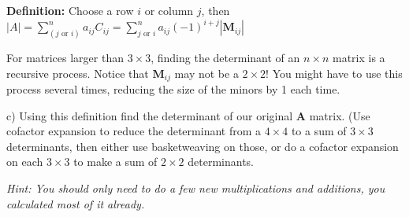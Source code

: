 \documentclass{article}
\begin{document}
\begin{flushleft}
\textbf{Definition:} Choose a row $i$ or column $j$, then $|A|=\sum\limits^{n}_{(j \text{ or } i)} a_{ij} C_{ij} = \sum\limits^{n}_{j \text{ or } i} a_{ij} (-1)^{i+j} |\textbf{M}_{ij}| $

\vspace{0.2in}

For matrices larger than $3 \times 3$, finding the determinant of an $n \times n$ matrix is a recursive process.  Notice that $\textbf{M}_{ij}$ may not be a $2 \times 2$!  You might have to use this process several times, reducing the size of the minors by 1 each time.

\vspace{0.2in}

c) Using this definition find the determinant of our original $\textbf{A}$ matrix.  (Use cofactor expansion to reduce the determinant from a $4 \times 4$ to a sum of $3 \times 3$ determinants, then either use basketweaving on those, or do a cofactor expansion on each $3 \times 3$ to make a sum of $2 \times 2$ determinants.

\vspace{0.2in}

\textit{Hint: You should only need to do a few new multiplications and additions, you calculated most of it already.}

\end{flushleft}
\end{document}
